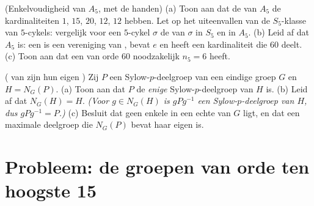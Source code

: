 \begin{exercise}[$\star\star\star$]\label{exo:b3:groups:11}
(Enkelvoudigheid van $A_5$, met de handen)
(a) Toon aan dat de  van $A_5$ de kardinaliteiten
$1$, $15$, $20$, $12$, $12$ hebben. Let op het uiteenvallen van de
$S_5$-klasse van $5$-cykels: vergelijk voor een $5$-cykel $\sigma$
de  van $\sigma$ in $S_5$ en in $A_5$.
(b) Leid af dat $A_5$  is: een  is een
vereniging van , bevat $e$ en heeft een
kardinaliteit die $60$ deelt.
(c) Toon aan dat een  van orde $60$ noodzakelijk
$n_5 = 6$ heeft.
\end{exercise}

\begin{exercise}[$\star\star$]\label{exo:b3:groups:12}
( van  zijn hun eigen )
Zij $P$ een Sylow-$p$-deelgroep van een eindige groep $G$ en $H =
N_G(P)$.
(a) Toon aan dat $P$ de \emph{enige} Sylow-$p$-deelgroep van $H$
is.
(b) Leid af dat $N_G(H) = H$. \emph{(Voor $g \in N_G(H)$ is
$gPg^{-1}$ een Sylow-$p$-deelgroep van $H$, dus $gPg^{-1} = P$.)}
(c) Besluit dat geen enkele  in een echte
 van $G$ ligt, en dat een maximale deelgroep die
$N_G(P)$ bevat haar eigen  is.
\end{exercise}

\section{Probleem: de groepen van orde ten hoogste 15}

